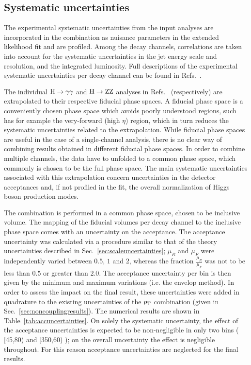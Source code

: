 \subsection{Systematic uncertainties}
\label{sec:systematics}

The experimental systematic uncertainties from the input analyses are incorporated in the combination as nuisance parameters in the extended likelihood fit and are profiled.
% 
Among the decay channels, correlations are taken into account for the systematic uncertainties in the jet energy scale and resolution, and the integrated luminosity.
% 
Full descriptions of the experimental systematic uncertainties per decay channel can be found in Refs.~\cite{Sirunyan:2018kta,CMS_AN_2016-442,CMS_AN_2016-366}.
% 


The individual $\mathrm{H}\to\mathrm{\gamma}\mathrm{\gamma}$ and $\mathrm{H}\to\mathrm{Z}\mathrm{Z}$ analyses in Refs.~\cite{} (respectively) are extrapolated to their respective fiducial phase spaces.
% 
A fiducial phase space is a conveniently chosen phase space which avoids poorly understood regions, such has for example the very-forward (high $\eta$) region, which in turn reduces the systematic uncertainties related to the extrapolation.
% 
While fiducial phase spaces are useful in the case of a single-channel analysis, there is no clear way of combining results obtained in different fiducial phase spaces.
% 
In order to combine multiple channels, the data have to unfolded to a common phase space, which commonly is chosen to be the full phase space.
% 
The main systematic uncertainties associated with this extrapolation concern uncertainties in the detector acceptances and, if not profiled in the fit, the overall normalization of Higgs boson production modes.



The combination is performed in a common phase space, chosen to be inclusive volume.
% 
The mapping of the fiducial volumes per decay channel to the inclusive phase space comes with an uncertainty on the acceptance.
% 
The acceptance uncertainty was calculated via a procedure similar to that of the theory uncertainties described in Sec.~\ref{sec:scaleuncertainties}; $\mu_R$ and $\mu_F$ were independently varied between $0.5$, $1$ and $2$, whereas the fraction $\frac{\mu_R}{\mu_F}$ was not to be less than $0.5$ or greater than $2.0$.
% 
The acceptance uncertainty per bin is then given by the minimum and maximum variations (i.e. the envelop method).
% 
In order to assess the impact on the final result, these uncertainties were added in quadrature to the existing uncertainties of the $p_\mathrm{T}$ combination (given in Sec.~\ref{sec:noncouplingresults}).
%
The numerical results are shown in Table~\ref{tab:accuncertainties}.
% 
On solely the systematic uncertainty, the effect of the acceptance uncertainties is expected to be non-negligible in only two bins ( [45,80) and [350,60) ); on the overall uncertainty the effect is negligible throughout.
% 
For this reason acceptance uncertainties are neglected for the final results.

